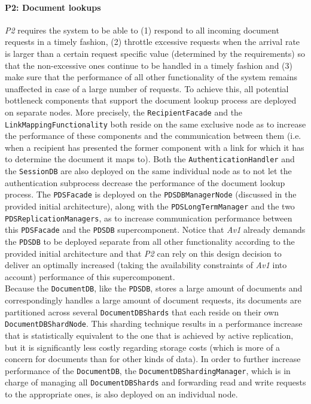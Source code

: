 \documentclass[a4paper,10pt]{article}
\begin{document}
\paragraph{P2: Document lookups}
\textit{P2} requires the system to be able to (1) respond to all incoming document requests in a timely fashion, (2) throttle excessive requests when the arrival rate is larger than a certain request specific value (determined by the requirements) so that the non-excessive ones continue to be handled in a timely fashion and (3) make sure that the performance of all other functionality of the system remains unaffected in case of a large number of requests. To achieve this, all potential bottleneck components that support the document lookup process are deployed on separate nodes. More precisely, the \texttt{RecipientFacade} and the \texttt{LinkMappingFunctionality} both reside on the same exclusive node as to increase the performance of these components and the communication between them (i.e. when a recipient has presented the former component with a link for which it has to determine the document it maps to). Both the \texttt{AuthenticationHandler} and the \texttt{SessionDB} are also deployed on the same individual node as to not let the authentication subprocess decrease the performance of the document lookup process. The \texttt{PDSFacade} is deployed on the \texttt{PDSDBManagerNode} (discussed in the provided initial architecture), along with the \texttt{PDSLongTermManager} and the two \texttt{PDSReplicationManagers}, as to increase communication performance between this \texttt{PDSFacade} and the \texttt{PDSDB} supercomponent. Notice that \textit{Av1} already demands the \texttt{PDSDB} to be deployed separate from all other functionality according to the provided initial architecture and that \textit{P2} can rely on this design decision to deliver an optimally increased (taking the availability constraints of \textit{Av1} into account) performance of this supercomponent.\\
Because the \texttt{DocumentDB}, like the \texttt{PDSDB}, stores a large amount of documents and correspondingly handles a large amount of document requests, its documents are partitioned across several \texttt{DocumentDBShards} that each reside on their own \texttt{DocumentDBShardNode}. This sharding technique results in a performance increase that is statistically equivalent to the one that is achieved by active replication, but it is significantly less costly regarding storage costs (which is more of a concern for documents than for other kinds of data). In order to further increase performance of the \texttt{DocumentDB}, the \texttt{DocumentDBShardingManager}, which is in charge of managing all \texttt{DocumentDBShards} and forwarding read and write requests to the appropriate ones, is also deployed on an individual node.\\
\end{document}
